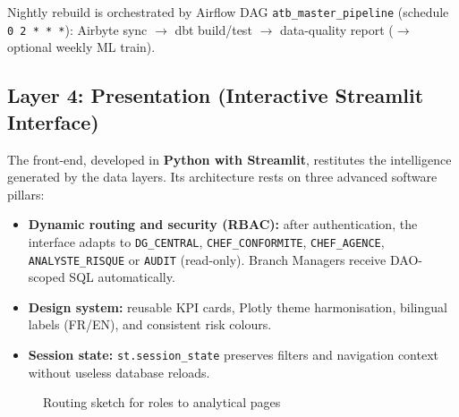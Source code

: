 Nightly rebuild is orchestrated by Airflow DAG \texttt{atb\_master\_pipeline}
(schedule \texttt{0 2 * * *}): Airbyte sync $\rightarrow$ dbt build/test
$\rightarrow$ data-quality report ($\rightarrow$ optional weekly ML train).

\subsection{Layer 4: Presentation (Interactive Streamlit Interface)}
The front-end, developed in \textbf{Python with Streamlit}, restitutes the
intelligence generated by the data layers. Its architecture rests on three
advanced software pillars:

\begin{itemize}
    \item \textbf{Dynamic routing and security (RBAC):} after authentication, the
          interface adapts to \texttt{DG\_CENTRAL}, \texttt{CHEF\_CONFORMITE},
          \texttt{CHEF\_AGENCE}, \texttt{ANALYSTE\_RISQUE} or \texttt{AUDIT}
          (read-only). Branch Managers receive DAO-scoped SQL automatically.
    \item \textbf{Design system:} reusable KPI cards, Plotly theme harmonisation,
          bilingual labels (FR/EN), and consistent risk colours.
    \item \textbf{Session state:} \texttt{st.session\_state} preserves filters and
          navigation context without useless database reloads.
\end{itemize}

\begin{figure}[H]
\centering
{}
\caption{Routing sketch for roles to analytical pages}
\label{fig:rbac_routing_tikz}
\end{figure}


